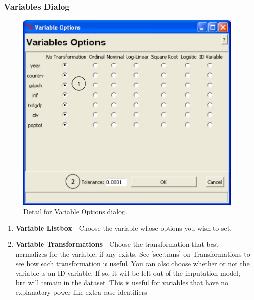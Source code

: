 \documentclass[12pt,titlepage]{article}
\begin{document}
\subsubsection{Variables Dialog}
\label{sec:vardiag}
\begin{figure}[ht]
  \centering \includegraphics[scale=.75]{varopts}
  \caption{Detail for Variable Options dialog.}
\end{figure}
\begin{enumerate}
\item \textbf{Variable Listbox} - Choose the variable whose options
  you wish to set.
\item \textbf{Variable Transformations} - Choose the transformation
  that best normalizes for the variable, if any exists.  See
  \ref{sec:trans} on Transformations to see how each transformation is
  useful.  You can also choose whether or not the variable is an ID
  variable.  If so, it will be left out of the imputation model, but
  will remain in the dataset.  This is useful for variables that have
  no explanatory power like extra case identifiers.
\end{enumerate}
\end{document}
